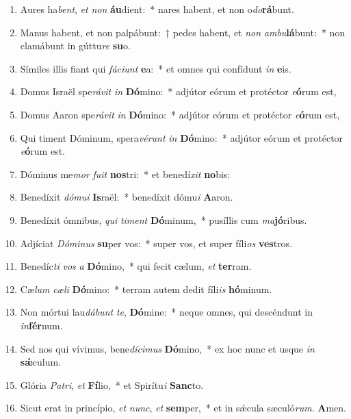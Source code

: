 \documentclass[twoside]{article}
\begin{document}
\begin{paracol}[1]{2}
\begin{enumerate}[wide, itemsep=0mm, labelwidth=!, labelindent=0pt, label=\color{gregoriocolor}\theenumi]
\item Aures ha\textit{bent}, \textit{et} \textit{non} \textbf{áu}dient:~* nares habent, et non o\textit{do}\textbf{rá}bunt.
\item Manus habent, et non palpábunt:~† pedes habent, et \textit{non} \textit{am}\textit{bu}\textbf{lá}bunt:~* non clamábunt in gúttu\textit{re} \textbf{su}o.
\item Símiles illis fiant qui \textit{fá}\textit{ci}\textit{unt} \textbf{e}a:~* et omnes qui confídunt \textit{in} \textbf{e}is.
\newpage
\item Domus Israël spe\textit{rá}\textit{vit} \textit{in} \textbf{Dó}mino:~* adjútor eórum et protéctor \textit{e}\textbf{ó}rum est,
\item Domus Aaron spe\textit{rá}\textit{vit} \textit{in} \textbf{Dó}mino:~* adjútor eórum et protéctor \textit{e}\textbf{ó}rum est,
\item Qui timent Dóminum, spera\textit{vé}\textit{runt} \textit{in} \textbf{Dó}mino:~* adjútor eórum et protéctor \textit{e}\textbf{ó}rum est.
\item Dóminus me\textit{mor} \textit{fu}\textit{it} \textbf{nos}tri:~* et benedí\textit{xit} \textbf{no}bis:
\item Benedíxit \textit{dó}\textit{mu}\textit{i} \textbf{Is}raël:~* benedíxit dómu\textit{i} \textbf{A}aron.
\item Benedíxit ómnibus, \textit{qui} \textit{ti}\textit{ment} \textbf{Dó}minum,~* pusíllis cum \textit{ma}\textbf{jó}ribus.
\item Adjíciat \textit{Dó}\textit{mi}\textit{nus} \textbf{su}per vos:~* super vos, et super fíli\textit{os} \textbf{ves}tros.
\item Benedíc\textit{ti} \textit{vos} \textit{a} \textbf{Dó}mino,~* qui fecit cælum, \textit{et} \textbf{ter}ram.
\item Cæ\textit{lum} \textit{cæ}\textit{li} \textbf{Dó}mino:~* terram autem dedit fíli\textit{is} \textbf{hó}minum.
\item Non mórtui lau\textit{dá}\textit{bunt} \textit{te}, \textbf{Dó}mine:~* neque omnes, qui descéndunt in \textit{in}\textbf{fér}num.
\item Sed nos qui vívimus, bene\textit{dí}\textit{ci}\textit{mus} \textbf{Dó}mino,~* ex hoc nunc et usque \textit{in} \textbf{sǽ}culum.
\item Glória \textit{Pa}\textit{tri}, \textit{et} \textbf{Fí}lio,~* et Spirítu\textit{i} \textbf{Sanc}to.
\item Sicut erat in princípio, \textit{et} \textit{nunc}, \textit{et} \textbf{sem}per,~* et in sǽcula sæculó\textit{rum}. \textbf{A}men.
\end{enumerate}


\end{paracol}
\end{document}
